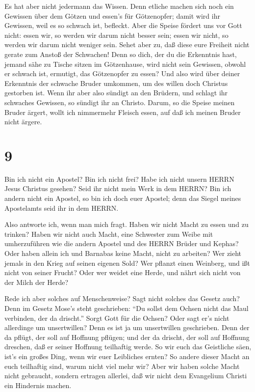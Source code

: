  Es hat aber nicht jedermann das Wissen. Denn etliche machen
sich noch ein Gewissen über dem Götzen und essen's für Götzenopfer;
damit wird ihr Gewissen, weil es so schwach ist, befleckt. 
Aber die Speise fördert uns vor Gott nicht: essen wir, so werden wir
darum nicht besser sein; essen wir nicht, so werden wir darum nicht
weniger sein.  Sehet aber zu, daß diese eure Freiheit nicht
gerate zum Anstoß der Schwachen!  Denn so dich, der du die
Erkenntnis hast, jemand sähe zu Tische sitzen im Götzenhause, wird nicht
sein Gewissen, obwohl er schwach ist, ermutigt, das Götzenopfer zu
essen?  Und also wird über deiner Erkenntnis der schwache
Bruder umkommen, um des willen doch Christus gestorben ist.
 Wenn ihr aber also sündigt an den Brüdern, und schlagt ihr
schwaches Gewissen, so sündigt ihr an Christo.  Darum, so
die Speise meinen Bruder ärgert, wollt ich nimmermehr Fleisch essen, auf
daß ich meinen Bruder nicht ärgere.

\hypertarget{section-8}{%
\section{9}\label{section-8}}

 Bin ich nicht ein Apostel? Bin ich nicht frei? Habe ich
nicht unsern HERRN Jesus Christus gesehen? Seid ihr nicht mein Werk in
dem HERRN?  Bin ich andern nicht ein Apostel, so bin ich
doch euer Apostel; denn das Siegel meines Apostelamts seid ihr in dem
HERRN.

 Also antworte ich, wenn man mich fragt.  Haben
wir nicht Macht zu essen und zu trinken?  Haben wir nicht
auch Macht, eine Schwester zum Weibe mit umherzuführen wie die andern
Apostel und des HERRN Brüder und Kephas?  Oder haben allein
ich und Barnabas keine Macht, nicht zu arbeiten?  Wer zieht
jemals in den Krieg auf seinen eigenen Sold? Wer pflanzt einen Weinberg,
und ißt nicht von seiner Frucht? Oder wer weidet eine Herde, und nährt
sich nicht von der Milch der Herde?

 Rede ich aber solches auf Menschenweise? Sagt nicht solches
das Gesetz auch?  Denn im Gesetz Mose's steht geschrieben:
``Du sollst dem Ochsen nicht das Maul verbinden, der da drischt.'' Sorgt
Gott für die Ochsen?  Oder sagt er's nicht allerdinge um
unsertwillen? Denn es ist ja um unsertwillen geschrieben. Denn der da
pflügt, der soll auf Hoffnung pflügen; und der da drischt, der soll auf
Hoffnung dreschen, daß er seiner Hoffnung teilhaftig werde.
 So wir euch das Geistliche säen, ist's ein großes Ding,
wenn wir euer Leibliches ernten?  So andere dieser Macht an
euch teilhaftig sind, warum nicht viel mehr wir? Aber wir haben solche
Macht nicht gebraucht, sondern ertragen allerlei, daß wir nicht dem
Evangelium Christi ein Hindernis machen.

